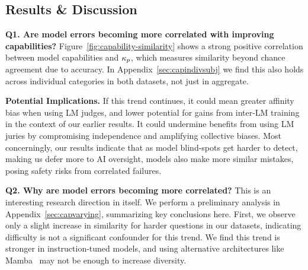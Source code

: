 \subsection{Results \& Discussion}

\textbf{Q1. Are model errors becoming more correlated with improving capabilities?} Figure~\ref{fig:capability-similarity} shows a strong positive correlation between model capabilities and $\kappa_{p}$, which measures similarity beyond chance agreement due to accuracy. In Appendix~\ref{sec:capindivsubj} we find this also holds across individual categories in both datasets, not just in aggregate.

\textbf{Potential Implications.} If this trend continues, it could mean greater affinity bias when using LM judges, and lower potential for gains from inter-LM training in the context of our earlier results. It could undermine benefits from using LM juries by compromising independence and amplifying collective biases. Most concerningly, our results indicate that as model blind-spots get harder to detect, making us defer more to AI oversight, models also make more similar mistakes, posing safety risks from correlated failures. 

\textbf{Q2. Why are model errors becoming more correlated?} This is an interesting research direction in itself. We perform a preliminary analysis in Appendix~\ref{sec:capvarying}, summarizing key conclusions here. First, we observe only a slight increase in similarity for harder questions in our datasets, indicating difficulty is not a significant confounder for this trend. We find this trend is stronger in instruction-tuned models, and using alternative architectures like Mamba~\citep{gu2023mamba} may not be enough to increase diversity.